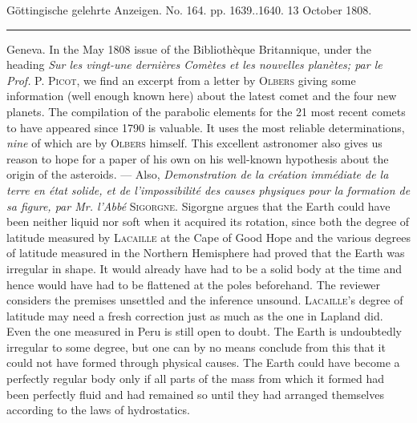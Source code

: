 \clearpage
{}
\hypertarget{native-512-lower}{}\label{native-512-lower}
\begin{center}\small Göttingische gelehrte Anzeigen. No. 164. pp. 1639..1640. 13 October 1808.\\[3pt]\rule{.72\linewidth}{.3pt}\end{center}

Geneva. In the May 1808 issue of the Bibliothèque Britannique, under the heading \emph{Sur les vingt-une dernières Comètes et les nouvelles planètes; par le Prof.} \textsc{P. Picot}, we find an excerpt from a letter by \textsc{Olbers} giving some information (well enough known here) about the latest comet and the four new planets. The compilation of the parabolic elements for the 21 most recent comets to have appeared since 1790 is valuable. It uses the most reliable determinations, \emph{nine} of which are by \textsc{Olbers} himself. This excellent astronomer also gives us reason to hope for a paper of his own on his well-known hypothesis about the origin of the asteroids. --- Also, \emph{Demonstration de la création immédiate de la terre en état solide, et de l'impossibilité des causes physiques pour la formation de sa figure, par Mr. l'Abbé} \textsc{Sigorgne}. Sigorgne argues that the Earth could have been neither liquid nor soft when it acquired its rotation, since both the degree of latitude measured by \textsc{Lacaille} at the Cape of Good Hope and the various degrees of latitude measured in the Northern Hemisphere had proved that the Earth was irregular in shape. It would already have had to be a solid body at the time and hence would have had to be flattened at the poles beforehand. The reviewer considers the premises unsettled and the inference unsound. \textsc{Lacaille}’s degree of latitude may need a fresh correction just as much as the one in Lapland did. Even the one measured in Peru is still open to doubt. The Earth is undoubtedly irregular to some degree, but one can by no means conclude from this that it could not have formed through physical causes. The Earth could have become a perfectly regular body only if all parts of the mass from which it formed had been perfectly fluid and had remained so until they had arranged themselves according to the laws of hydrostatics.
